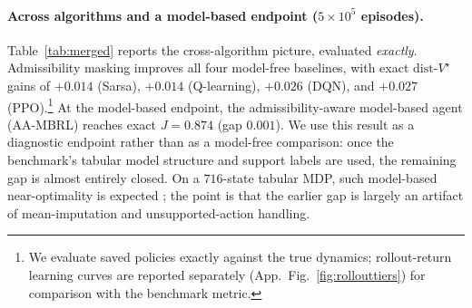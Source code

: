 \documentclass{article}
\newcommand{\dist}{\mathrm{dist}\text{-}V^\star}
\begin{document}
\paragraph{Across algorithms and a model-based endpoint ($5{\times}10^5$ episodes).}
Table~\ref{tab:merged} reports the cross-algorithm picture, evaluated
\emph{exactly}. Admissibility masking improves all four model-free baselines,
with exact $\dist$ gains of $+0.014$ (Sarsa), $+0.014$ (Q-learning), $+0.026$
(DQN), and $+0.027$ (PPO).\footnote{We evaluate saved policies exactly against
the true dynamics; rollout-return learning curves are reported separately
(App.~Fig.~\ref{fig:rollouttiers}) for comparison with the benchmark metric.} At
the model-based endpoint, the admissibility-aware model-based agent (AA-MBRL)
reaches exact $J{=}0.874$ (gap $0.001$). We use this result as a diagnostic
endpoint rather than as a model-free comparison: once the benchmark's tabular
model structure and support labels are used, the remaining gap is almost entirely
closed. On a $716$-state tabular MDP, such model-based near-optimality is expected
\citep{auer2008ucrl,osband2013psrl}; the point is that the earlier gap is largely
an artifact of mean-imputation and unsupported-action handling.
\end{document}
